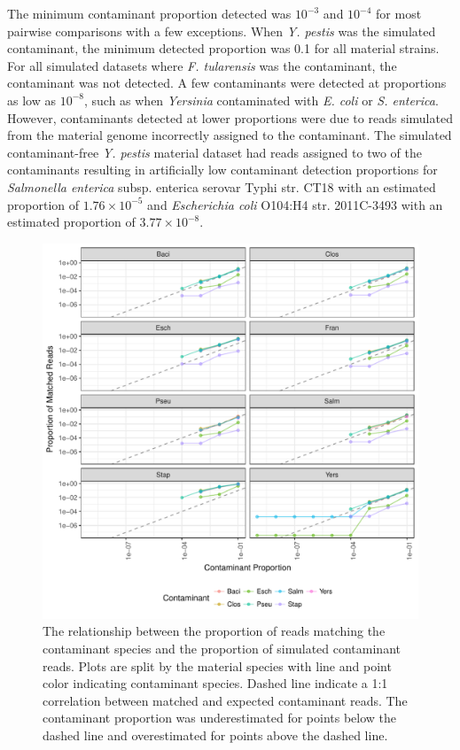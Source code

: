 \documentclass[fleqn,10pt,lineno]{wlpeerj}\usepackage[]{graphicx}\usepackage[]{color}
\makeatletter
\def\maxwidth{ %
  \ifdim\Gin@nat@width>\linewidth
    \linewidth
  \else
    \Gin@nat@width
  \fi
}
\newenvironment{knitrout}{}{} %
\makeatother
\begin{document}
The minimum contaminant proportion detected was $10^{-3}$ and  $10^{-4}$ for most pairwise comparisons with a few exceptions.
When \textit{Y. pestis} was the simulated contaminant, the minimum detected proportion was 0.1 for all material strains.
For all simulated datasets where \textit{F. tularensis} was the contaminant, the contaminant was not detected.
A few contaminants were detected at proportions as low as $10^{-8}$, such as when \textit{Yersinia} contaminated with \textit{E. coli} or \textit{S. enterica}.
However, contaminants detected at lower proportions were due to reads simulated from the material genome incorrectly assigned to the contaminant.
The simulated contaminant-free \textit{Y. pestis} material dataset had reads assigned to two of the contaminants resulting in artificially low contaminant detection proportions for \textit{Salmonella enterica} subsp. {enterica} serovar Typhi str. CT18 with an estimated proportion of \ensuremath{1.76\times 10^{-5}} and \textit{Escherichia coli} O104:H4 str. 2011C-3493 with an estimated proportion of \ensuremath{3.77\times 10^{-8}}.

\begin{knitrout}
\color{fgcolor}\begin{figure}
\includegraphics[width=\maxwidth]{figure/contam_fig-1} \caption[The relationship between the proportion of reads matching the contaminant species and the proportion of simulated contaminant reads]{The relationship between the proportion of reads matching the contaminant species and the proportion of simulated contaminant reads. Plots are split by the material species with line and point color indicating contaminant species. Dashed line indicate a 1:1 correlation between matched and expected contaminant reads. The contaminant proportion was underestimated for points below the dashed line and overestimated for points above the dashed line.}\label{fig:contam_fig}
\end{figure}


\end{knitrout}
\end{document}
